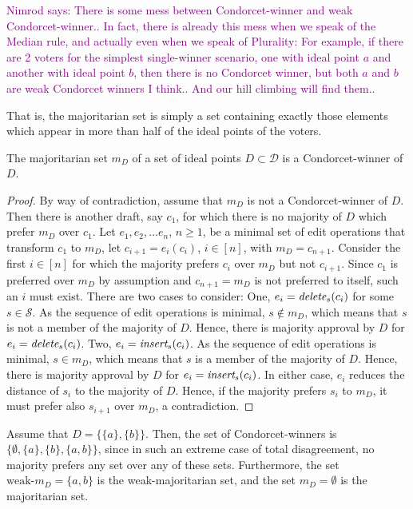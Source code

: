 \documentclass{llncs}
\newcommand{\nimrod}[1]{\textcolor{purple}{Nimrod says: #1}}
\newcommand{\calD}{\mathcal{D}}
\newcommand{\calS}{\mathcal{S}}
\newcommand{\iinsert}[1]{\emph{insert}_{#1}}
\newcommand{\ddelete}[1]{\emph{delete}_{#1}}
\begin{document}
\nimrod{There is some mess between Condorcet-winner and weak Condorcet-winner.. In fact, there is already this mess when we speak of the Median rule, and actually even when we speak of Plurality:
  For example, if there are 2 voters for the simplest single-winner scenario, one with ideal point $a$ and another with ideal point $b$, then there is no Condorcet winner, but both $a$ and $b$ are weak Condorcet winners I think.. And our hill climbing will find them..}

That is, the majoritarian set is simply a set containing exactly those elements which appear in more than half of the ideal points of the voters.

\begin{lemma}
\label{lemma:condorcet-majoritarian}
The majoritarian set $m_D$ of a set of ideal points $D \subset \calD$ is a Condorcet-winner of $D$.
\end{lemma}

\begin{proof}
%
By way of contradiction, assume that $m_D$ is not a Condorcet-winner of $D$.  Then there is another draft, say $c_1$, for which there is no majority of $D$ which prefer $m_D$ over $c_1$.  
Let $e_1, e_2, \ldots e_n$, $n \ge 1$, be a minimal set of edit operations that transform $c_1$ to $m_D$,  let $c_{i+1} = e_i(c_i)$, $ i \in [n]$, with $m_D = c_{n+1}$. Consider the first $i \in [n]$ for which the majority prefers $c_i$ over $m_D$ but not $c_{i+1}$.  Since $c_1$ is preferred over $m_D$ by assumption and $c_{n+1} = m_D$ is not preferred to itself, such an $i$ must exist.   
There are two cases to consider: One, $e_i = \ddelete{s}(c_i)$ for some $s \in \calS$.  As the sequence of edit operations is minimal,  $s \notin m_D$, which means that $s$ is not a member of the majority of $D$.  Hence, there is majority approval by $D$ for $e_i = \ddelete{s}(c_i)$.
Two, $e_i = \iinsert{s}(c_i)$.  As the sequence of edit operations is minimal,  $s \in m_D$, which means that $s$ is a member of the majority of $D$.  Hence, there is majority approval by $D$ for $e_i = \iinsert{s}(c_i)$.  In either case, $e_i$ reduces the distance of $s_i$ to the majority of $D$. Hence, if the majority prefers $s_i$ to $m_D$, it must prefer also $s_{i+1}$ over $m_D$, a contradiction.
%
\end{proof}

\begin{example}
%
Assume that $D = \{ \{a\}, \{b\} \}$.
Then, the set of Condorcet-winners is
$\{ \emptyset, \{a\}, \{b\}, \{a,b\} \}$, since in such an extreme case of total disagreement, no majority prefers any set over any of these sets.
Furthermore, the set $\textrm{weak-}m_D = \{a, b\}$ is the weak-majoritarian set, and the set $m_D = \emptyset$ is the majoritarian set.
%
\end{example}
\end{document}
